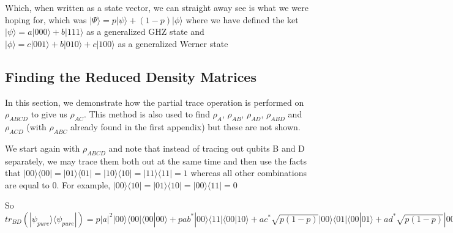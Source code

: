 \documentclass[12pt,a4paper]{article}
\numberwithin{equation}{section}
\begin{document}
\vskip 5mm

Which, when written as a state vector, we can straight away see is what we were hoping for, which was $|\Psi\rangle = p|\psi\rangle + (1-p)|\phi\rangle$ where we have defined the ket $|\psi\rangle = a|000\rangle + b|111\rangle$ as a generalized GHZ state and $|\phi\rangle = c|001\rangle + b|010\rangle + c|100\rangle$ as a generalized Werner state

\newpage

\subsection{Finding the Reduced Density Matrices}
\label{app:redDensMat}

In this section, we demonstrate how the partial trace operation is performed on $\rho_{ABCD}$ to give us $\rho_{AC}$. This method is also used to find $\rho_{A}$, $\rho_{AB}$, $\rho_{AD}$, $\rho_{ABD}$ and $\rho_{ACD}$ (with $\rho_{ABC}$ already found in the first appendix) but these are not shown.

\vskip 5mm

We start again with $\rho_{ABCD}$ and note that instead of tracing out qubits B and D separately, we may trace them both out at the same time and then use the facts that $|00\rangle\langle00| = |01\rangle\langle01| = |10\rangle\langle10| = |11\rangle\langle11| = 1$ whereas all other combinations are equal to $0$. For example, $|00\rangle\langle10| = |01\rangle\langle10| = |00\rangle\langle11| = 0$

\vskip 5mm

So $tr_{BD}(|\psi_{pure}\rangle\langle\psi_{pure}|) =
p|a|^2|00\rangle\langle00|\langle00|00\rangle + pab^*|00\rangle\langle11|\langle00|10\rangle + ac^*\sqrt{p(1-p)}|00\rangle\langle01|\langle00|01\rangle + ad^*\sqrt{p(1-p)}|00\rangle\langle00|\langle00|11\rangle + af^*\sqrt{p(1-p)}|00\rangle\langle10|\langle00|01\rangle + pba^*|11\rangle\langle00|\langle10|00\rangle + p|b|^2|11\rangle\langle11|\langle10|10\rangle + bc^*\sqrt{p(1-p)}|11\rangle\langle01|\langle10|01\rangle + bd^*\sqrt{p(1-p)}|11\rangle\langle00|\langle10|11\rangle + bf^*\sqrt{p(1-p)}|11\rangle\langle10|\langle10|01\rangle + ca^*\sqrt{p(1-p)}|01\rangle\langle00|\langle01|00\rangle + cb^*\sqrt{p(1-p)}|01\rangle\langle11|\langle01|10\rangle + |c|^2(1-p)|01\rangle\langle01|\langle01|01\rangle + cd^*(1-p)|01\rangle\langle00|\langle01|11\rangle + cf^*(1-p)|01\rangle\langle10|\langle01|01\rangle + da^*\sqrt{p(1-p)}|010\rangle\langle00|\langle11|00\rangle + db^*\sqrt{p(1-p)}|00\rangle\langle111|\langle11|10\rangle + dc^*(1-p)|00\rangle\langle01|\langle11|01\rangle + |d|^2(1-p)|00\rangle\langle00|\langle11|11\rangle + df^*(1-p)|00\rangle\langle10|\langle11|01\rangle + fa^*\sqrt{p(1-p)}|10\rangle\langle00|\langle01|00\rangle + fb^*\sqrt{p(1-p)}|10\rangle\langle11|\langle01|10\rangle + fc^*(1-p)|10\rangle\langle01|\langle01|01\rangle + fd^*(1-p)|10\rangle\langle00|\langle01|11\rangle + |f|^2(1-p)|10\rangle\langle10|\langle01|01\rangle$
\end{document}
